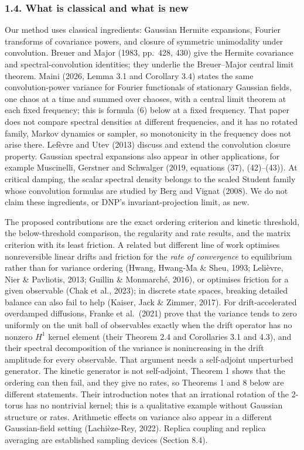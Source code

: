 \documentclass[
  british,
  11pt,
  a4paper,
]{article}
\begin{document}
\subsubsection{1.4. What is classical and what is
new}\label{what-is-classical-and-what-is-new}

Our method uses classical ingredients: Gaussian Hermite expansions,
Fourier transforms of covariance powers, and closure of symmetric
unimodality under convolution. Breuer and Major (1983, pp.~428, 430)
give the Hermite covariance and spectral-convolution identities; they
underlie the Breuer--Major central limit theorem. Maini (2026, Lemma 3.1
and Corollary 3.4) states the same convolution-power variance for
Fourier functionals of stationary Gaussian fields, one chaos at a time
and summed over chaoses, with a central limit theorem at each fixed
frequency; this is formula (6) below at a fixed frequency. That paper
does not compare spectral densities at different frequencies, and it has
no rotated family, Markov dynamics or sampler, so monotonicity in the
frequency does not arise there. Lefèvre and Utev (2013) discuss and
extend the convolution closure property. Gaussian spectral expansions
also appear in other applications, for example Muscinelli, Gerstner and
Schwalger (2019, equations (37), (42)--(43)). At critical damping, the
scalar spectral density belongs to the scaled Student family whose
convolution formulas are studied by Berg and Vignat (2008). We do not
claim these ingredients, or DNP's invariant-projection limit, as new.

The proposed contributions are the exact ordering criterion and kinetic
threshold, the below-threshold comparison, the regularity and rate
results, and the matrix criterion with its least friction. A related but
different line of work optimises nonreversible linear drifts and
friction for the \emph{rate of convergence} to equilibrium rather than
for variance ordering (Hwang, Hwang-Ma \& Sheu, 1993; Lelièvre, Nier \&
Pavliotis, 2013; Guillin \& Monmarché, 2016), or optimises friction for
a given observable (Chak et al., 2023); in discrete state spaces,
breaking detailed balance can also fail to help (Kaiser, Jack \& Zimmer,
2017). For drift-accelerated overdamped diffusions, Franke et al.~(2021)
prove that the variance tends to zero uniformly on the unit ball of
observables exactly when the drift operator has no nonzero \(H^1\)
kernel element (their Theorem 2.4 and Corollaries 3.1 and 4.3), and
their spectral decomposition of the variance is nonincreasing in the
drift amplitude for every observable. That argument needs a self-adjoint
unperturbed generator. The kinetic generator is not self-adjoint,
Theorem 1 shows that the ordering can then fail, and they give no rates,
so Theorems 1 and 8 below are different statements. Their introduction
notes that an irrational rotation of the 2-torus has no nontrivial
kernel; this is a qualitative example without Gaussian structure or
rates. Arithmetic effects on variance also appear in a different
Gaussian-field setting (Lachièze-Rey, 2022). Replica coupling and
replica averaging are established sampling devices (Section 8.4).
\end{document}
